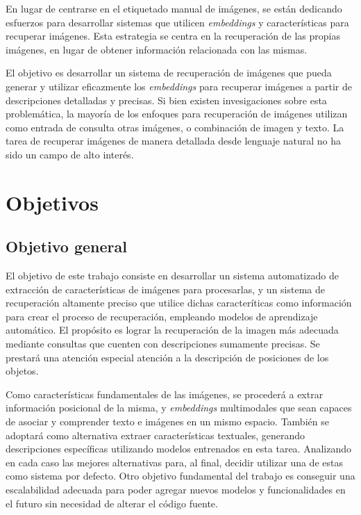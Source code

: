 En lugar de centrarse en el etiquetado manual de imágenes, se están dedicando esfuerzos para desarrollar sistemas que utilicen \textit{embeddings} y características para recuperar imágenes. Esta estrategia se centra en la recuperación de las propias imágenes, en lugar de obtener información relacionada con las mismas.

El objetivo es desarrollar un sistema de recuperación de imágenes que pueda generar y utilizar eficazmente los \textit{embeddings} para recuperar imágenes a partir de descripciones detalladas y precisas. Si bien existen invesigaciones sobre esta problem\'atica, la mayor\'ia de los enfoques para recuperaci\'on de im\'agenes utilizan como entrada de consulta otras im\'agenes, o combinaci\'on de imagen y texto. La tarea de recuperar im\'agenes de manera detallada desde lenguaje natural no ha sido un campo de alto inter\'es.

\section*{Objetivos}

\subsection*{Objetivo general}

El objetivo de este trabajo consiste en desarrollar un sistema automatizado de extracci\'on de caracter\'isticas de im\'agenes para procesarlas, y un sistema de recuperaci\'on altamente preciso que utilice dichas caracter\'iticas como informaci\'on para crear el proceso de recuperaci\'on, empleando modelos de aprendizaje autom\'atico. El prop\'osito es lograr la recuperaci\'on de la imagen m\'as adecuada mediante consultas que cuenten con descripciones sumamente precisas. Se prestar\'a una atenci\'on especial atenci\'on a la descripci\'on de posiciones de los objetos.

Como caracter\'isticas fundamentales de las im\'agenes, se proceder\'a a extrar informaci\'on posicional de la misma, y \textit{embeddings} multimodales que sean capaces de asociar y comprender texto e im\'agenes en un mismo espacio. Tambi\'en se adoptar\'a como alternativa extraer caracter\'isticas textuales, generando descripciones espec\'ificas utilizando modelos entrenados en esta tarea. Analizando en cada caso las mejores alternativas para, al final, decidir utilizar una de estas como sistema por defecto. Otro objetivo fundamental del trabajo es conseguir una escalabilidad adecuada para poder agregar nuevos modelos y funcionalidades en el futuro sin necesidad de alterar el c\'odigo fuente. 


